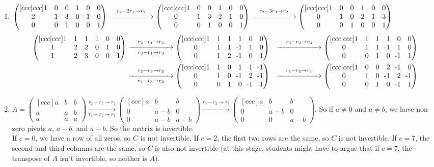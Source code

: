 \documentclass[11pt,twoside]{article}
\newcommand{\makearrow}[2]{\overset{#1}{\underset{#2}{\xrightarrow{\hspace{2cm}}}}}
\newcommand{\bpm}{\begin{pmatrix}}
\newcommand{\epm}{\end{pmatrix}}
\newcommand{\mn}{\llap{-}}
\begin{document}
\begin{enumerate}
  \item[27.] $\bpm[ccc|ccc] 1 & 0 & 0 & 1 & 0 & 0 \\ 2 & 1 & 3 & 0 & 1 & 0 \\ 0 & 0 & 1 & 0 & 0 & 1\epm \makearrow{r_2 - 2r_1 \rightarrow r_2}{} \bpm[ccc|ccc] 1 & 0 & 0 & 1 & 0 & 0 \\ 0 & 1 & 3 & \mn2   & 1 & 0 \\ 0 & 0 & 1 & 0 & 0 & 1\epm \makearrow{r_2 - 3r_3 \rightarrow r_2}{} \bpm[ccc|ccc] 1 & 0 & 0 & 1 & 0 & 0 \\ 0 & 1 & 0 & \mn2   & 1 & \mn3 \\ 0 & 0 & 1 & 0 & 0 & 1\epm$\\
  \begin{align*}
  \bpm[ccc|ccc] 1  & 1 & 1 & 1 & 0 & 0 \\ 1 & 2 & 2 & 0 & 1 & 0\\ 1 & 2 & 3 & 0 & 0 & 1\epm &\makearrow{r_2 - r_1 \rightarrow r_2}{r_3 - r_1 \rightarrow r_3} \bpm[ccc|ccc] 1 & 1 & 1 & 1 & 0 & 0 \\ 0 & 1 & 1 & \mn1 & 1 & 0 \\ 0 & 1 & 2 & \mn1 & 0 & 1\epm &\makearrow{r_3-r_2 \rightarrow r_3}{}\bpm[ccc|ccc] 1 & 1 & 1 & 1 & 0 & 0 \\ 0 & 1 & 1 & \mn1 & 1 & 0 \\ 0 & 0 & 1 & 0 & \mn 1 & 1\epm\\
   &\makearrow{r_2 - r_3 \rightarrow r_2}{r_1 - r_3 \rightarrow r_2}\bpm[ccc|ccc] 1 & 1 & 0 & 1 & 1 & \mn 1\\ 0 & 1 & 0 & \mn1 & 2 & \mn 1 \\ 0 & 0 & 1 & 0 & \mn1 & 1\epm &\makearrow{r_1 - r_2 \rightarrow r_1}{} \bpm[ccc|ccc] 1 & 0 & 0 & 2 & \mn1 & 0\\ 0 & 1 & 0 & \mn1 & 2 & \mn 1 \\ 0 & 0 & 1 & 0 & \mn1 & 1\epm 
  \end{align*}
\item[30.] $A = \bpm[ccc] a & b & b \\ a & a & b \\ a & a & a\epm \makearrow{r_2-r_1 \rightarrow r_2}{r_3-r_1 \rightarrow r_3}\bpm[ccc] a & b & b \\ 0 & a-b & 0 \\ 0 & a-b & a-b\epm \makearrow{r_3 - r_2 \rightarrow r_3}{} \bpm[ccc] a & b & b \\ 0 & a-b & 0 \\ 0 & 0 & a-b\epm$. So if $a\neq 0$ and $a\neq b$, we have non-zero pivots $a$, $a-b$, and $a-b$. So the matrix is invertible.\\

If $c=0$, we have a row of all zeros, so $C$ is not invertible. If $c=2$, the first two rows are the same, so $C$ is not invertible. If $c=7$, the second and third columns are the same, so $C$ is also not invertible (at this stage, students might have to argue that if $c=7$, the transpose of $A$ isn't invertible, so neither is $A$).
\end{enumerate}
\end{document}
